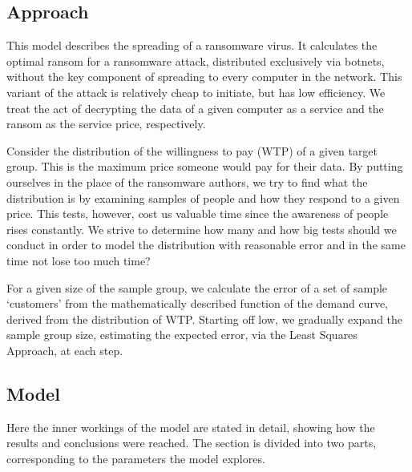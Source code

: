 \documentclass[11pt, a4paper]{article}
\theoremstyle{definition}
\begin{document}
		\subsection{Approach}
			This model describes the spreading of a ransomware virus. It calculates the optimal ransom for a ransomware attack, distributed exclusively via botnets, without the key component of spreading to every computer in the network. This variant of the attack is relatively cheap to initiate, but has low efficiency.	We treat the act of decrypting the data of a given computer as a service and the ransom as the service price, respectively. \par
			Consider the distribution of the willingness to pay (WTP) of a given target group. This is the maximum price someone would pay for their data. By putting ourselves in the place of the ransomware authors, we try to find what the distribution is by examining samples of people and how they respond to a given price. This tests, however, cost us valuable time since the awareness of people rises constantly. We strive to determine how many and how big tests should we conduct in order to model the distribution with reasonable error and in the same time not lose too much time?\par
			For a given size of the sample group, we calculate the error of a set of sample `customers' from the mathematically described function of the demand curve, derived from the distribution of WTP. Starting off low, we gradually expand the sample group size, estimating the expected error, via the Least Squares Approach, at each step.
		\subsection{Model}
			Here the inner workings of the model are stated in detail, showing how the results and conclusions were reached. The section is divided into two parts, corresponding to the parameters the model explores.
\end{document}
